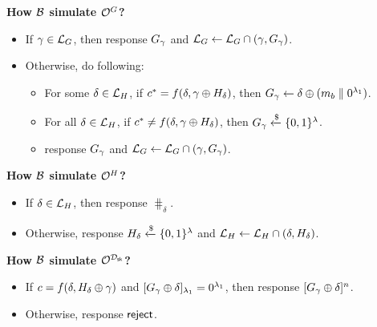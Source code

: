 \documentclass{article}
\theoremstyle{definition}
\begin{document}

\textbf{How $\mathcal{B}$ simulate $\mathcal{O}^{G}$?}

\begin{itemize}
	\item If $\gamma \in \mathcal{L}_{G}$, then response $G_{\gamma}$
	and $\mathcal{L}_{G} \gets \mathcal{L}_{G} \cap (\gamma, G_{\gamma})$.
	\item Otherwise, do following:
	\begin{itemize}
		\item For some $\delta \in \mathcal{L}_{H}$, if $c^* = f(\delta, \gamma \oplus
		H_{\delta})$, then $G_{\gamma} \gets \delta \oplus (m_{b} \parallel
		0^{\lambda_1})$.
		\item For all $\delta \in \mathcal{L}_{H}$, if $c^* \neq f(\delta, \gamma \oplus
		H_{\delta})$, then $G_{\gamma} \xleftarrow{\$} \{0 ,1\}^{\lambda}$.
		\item response $G_{\gamma}$ and $\mathcal{L}_{G} \gets \mathcal{L}_{G} \cap
		(\gamma, G_{\gamma})$.
	\end{itemize}
\end{itemize}

\textbf{How $\mathcal{B}$ simulate $\mathcal{O}^{H}$?}

\begin{itemize}
	\item If $\delta \in \mathcal{L}_{H}$, then response $\hash_\delta$.
	\item Otherwise, response $H_{\delta} \xleftarrow{\$} \{0 ,1\}^{\lambda}$ and
	$\mathcal{L}_{H} \gets \mathcal{L}_{H} \cap (\delta, H_{\delta})$.
\end{itemize}

\textbf{How $\mathcal{B}$ simulate $\mathcal{O}^{\mathcal{D}_{\textsf{sk}}}$?} 

\begin{itemize}
	\item If $c = f(\delta, H_{\delta} \oplus \gamma)$ and 
	$[G_{\gamma} \oplus \delta]_{\lambda_1} = 0^{\lambda_1}$, then
	response $[G_{\gamma} \oplus \delta]^n$.
	\item Otherwise, response $\textsf{reject}$.
\end{itemize}
\end{document}
